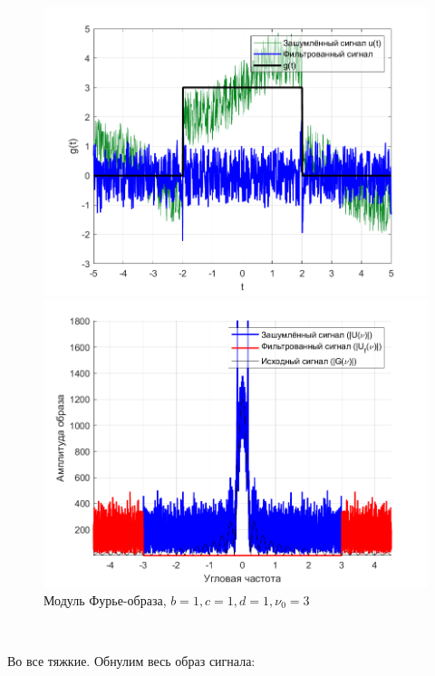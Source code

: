 \documentclass[a4paper]{article}
\begin{document}
\begin{figure}[H]
    \begin{minipage}{0.5\textwidth}
        \centering
        \includegraphics[width=\textwidth]{part3/1_1_1_3.png}
        \caption{$b = 1, c = 1, d = 1, \nu_0 = 3$}
    \end{minipage}    
    \begin{minipage}{0.5\textwidth}
        \centering
        \includegraphics[width=\textwidth]{part3/1_1_1_Fourier_3.png}
        \caption{Модуль Фурье-образа, $b = 1, c = 1, d = 1, \nu_0 = 3$}
    \end{minipage}
\end{figure}\

Во все тяжкие. Обнулим весь образ сигнала:
\end{document}
